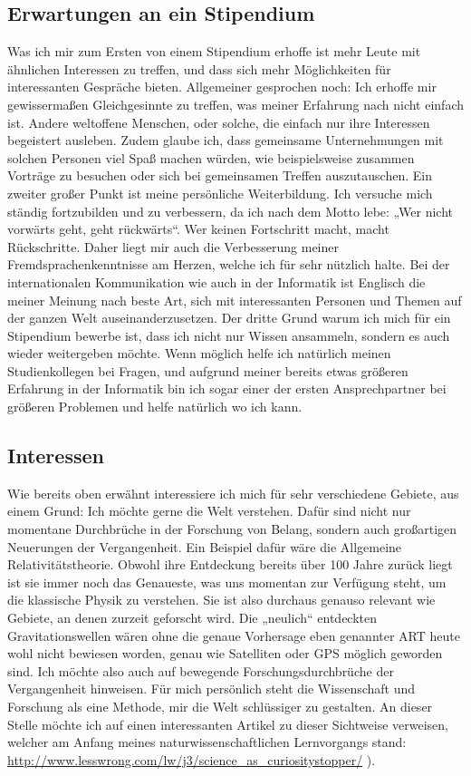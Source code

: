 \documentclass{scrartcl}
\begin{document}
\subsection*{Erwartungen an ein Stipendium}
Was ich mir zum Ersten von einem Stipendium erhoffe ist mehr Leute mit ähnlichen Interessen zu
treffen, und dass sich mehr Möglichkeiten für interessanten Gespräche bieten. Allgemeiner
gesprochen noch: Ich erhoffe mir gewissermaßen Gleichgesinnte zu treffen, was meiner Erfahrung
nach nicht einfach ist. Andere weltoffene Menschen, oder solche, die einfach nur ihre Interessen
begeistert ausleben. Zudem glaube ich, dass gemeinsame Unternehmungen mit solchen Personen viel
Spaß machen würden, wie beispielsweise zusammen Vorträge zu besuchen oder sich bei gemeinsamen
Treffen auszutauschen. Ein zweiter großer Punkt ist meine persönliche Weiterbildung. Ich versuche
mich ständig fortzubilden und zu verbessern, da ich nach dem Motto lebe: „Wer nicht vorwärts geht,
geht rückwärts“. Wer keinen Fortschritt macht, macht Rückschritte. Daher liegt mir auch die
Verbesserung meiner Fremdsprachenkenntnisse am Herzen, welche ich für sehr nützlich halte.
Bei der internationalen Kommunikation wie auch in der Informatik ist Englisch die meiner Meinung
nach beste Art, sich mit interessanten Personen und Themen auf der ganzen Welt auseinanderzusetzen.
Der dritte Grund warum ich mich für ein Stipendium bewerbe ist, dass ich nicht nur Wissen
ansammeln, sondern es auch wieder weitergeben möchte. Wenn möglich helfe ich natürlich meinen
Studienkollegen bei Fragen, und aufgrund meiner bereits etwas größeren Erfahrung in der Informatik
bin ich sogar einer der ersten Ansprechpartner bei größeren Problemen und helfe natürlich wo ich kann.

\subsection*{Interessen}
Wie bereits oben erwähnt interessiere ich mich für sehr verschiedene Gebiete, aus einem Grund:
Ich möchte gerne die Welt verstehen. Dafür sind nicht nur momentane Durchbrüche in der Forschung
von Belang, sondern auch großartigen Neuerungen der Vergangenheit. Ein Beispiel dafür wäre die
Allgemeine Relativitätstheorie. Obwohl ihre Entdeckung bereits über 100 Jahre zurück liegt ist
sie immer noch das Genaueste, was uns momentan zur Verfügung steht, um die klassische Physik
zu verstehen. Sie ist also durchaus genauso relevant wie Gebiete, an denen zurzeit geforscht
wird. Die „neulich“ entdeckten Gravitationswellen wären ohne die genaue Vorhersage eben genannter
ART heute wohl nicht bewiesen worden, genau wie Satelliten oder GPS möglich geworden sind.
Ich möchte also auch auf bewegende Forschungsdurchbrüche der Vergangenheit hinweisen. Für mich
persönlich steht die Wissenschaft und Forschung als eine Methode, mir die Welt schlüssiger zu
gestalten. An dieser Stelle möchte ich auf einen interessanten Artikel zu dieser Sichtweise
verweisen, welcher am Anfang meines naturwissenschaftlichen Lernvorgangs stand:
\url{http://www.lesswrong.com/lw/j3/science\_as\_curiositystopper/}
).
\end{document}
